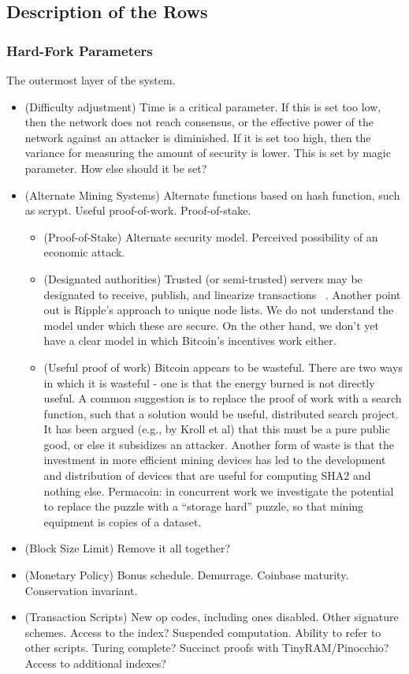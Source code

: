 \subsection{Description of the Rows}

\subsubsection{Hard-Fork Parameters}
The outermost layer of the system.
\begin{itemize}
\item (Difficulty adjustment) Time is a critical parameter. If this is set too low, then the network does not reach consensus, or the effective power of the network against an attacker is diminished. If it is set too high, then the variance for measuring the amount of security is lower. This is set by magic parameter. How else should it be set?
\item (Alternate Mining Systems) Alternate functions based on hash function, such as scrypt. Useful proof-of-work. Proof-of-stake.
  \begin{itemize}
  \item (Proof-of-Stake) Alternate security model. Perceived possibility of an economic attack.
  \item (Designated authorities) Trusted (or semi-trusted) servers may be designated to receive, publish, and linearize transactions ~\cite{lauriecoin}. Another point out is Ripple's approach to unique node lists. We do not understand the model under which these are secure. On the other hand, we don't yet have a clear model in which Bitcoin's incentives work either.
  \item (Useful proof of work) Bitcoin appears to be wasteful. There are two ways in which it is wasteful - one is that the energy burned is not directly useful. A common suggestion is to replace the proof of work with a search function, such that a solution would be useful, distributed search project. It has been argued (e.g., by Kroll et al) that this must be a pure public good, or else it subsidizes an attacker. Another form of waste is that the investment in more efficient mining devices has led to the development and distribution of devices that are useful for computing SHA2 and nothing else. Permacoin: in concurrent work we investigate the potential to replace the puzzle with a ``storage hard'' puzzle, so that mining equipment is copies of a dataset.~\cite{permacoin}
    \end{itemize}
\item (Block Size Limit) Remove it all together? 
\item (Monetary Policy) Bonus schedule. Demurrage. Coinbase maturity. Conservation invariant.
\item (Transaction Scripts) New op codes, including ones disabled. Other signature schemes. Access to the index? Suspended computation. Ability to refer to other scripts. Turing complete? Succinct proofs with TinyRAM/Pinocchio? Access to additional indexes?
\end{itemize}

